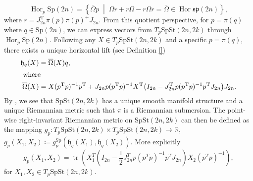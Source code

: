 %
\begin{equation*}
\operatorname{Hor}_{p}\mathrm{Sp}(2n)=\left\{ \overline{\Omega}p\;\middle|\;\Omega r+r\Omega-r\Omega r=\overline{\Omega}\in \operatorname{Hor}\mathfrak{sp}(2n) \right\},
\end{equation*}
%
where $r=J_{2n}^{\mathrm{T}}\pi(p)\pi (p)^+J_{2n}$. From this quotient perspective, for $p=\pi(q)$ where $q\in \mathrm{Sp}(2n)$, we can express vectors from $T_{p}\mathrm{SpSt}(2n, 2k)$ through $\operatorname{Hor}_{p}\mathrm{Sp}(2n)$. Following \cite[p.~5]{JensenZimmermann2024} any $X\in T_{p}\mathrm{SpSt}(2n, 2k)$ and a specific $p=\pi (q)$, there exists a unique horizontal lift (see Definition \ref{})
%
\begin{align}
\mathfrak{h}_{q}(X)&=\overline{\Omega}(X)q, \\
\intertext{ where }
\overline{\Omega}(X)&=X(p^{\mathrm{T}}p)^{-1}p^{\mathrm{T}}+J_{2n}p(p^{\mathrm{T}}p)^{-1}X^{\mathrm{T}}\big(I_{2n}-J_{2n}^{\mathrm{T}}p(p^{\mathrm{T}}p)^{-1}p^{\mathrm{T}}J_{2n}\big)J_{2n}.\label{eq:bar_omega}
\end{align}
%
%
%
%
By \cite[Thm.~2.28]{Lee2018}, we see that $\mathrm{SpSt}(2n, 2k)$ has a unique smooth manifold structure and a unique Riemannian metric such that $\pi$ is a Riemannian submersion. The point-wise right-invariant Riemannian metric on $\mathrm{SpSt}(2n, 2k)$ can then be defined as the mapping $g_{p}\colon T_{p}\mathrm{SpSt}(2n, 2k)\times T_{p}\mathrm{SpSt}(2n, 2k)\xrightarrow{}\mathbb{R}$, $g_{p}(X_{1},X_{2})\coloneqq g^{\mathrm{Sp}}_{p}(\mathfrak{h}_{q}(X_{1}),\mathfrak{h}_{q}(X_{2}))$. More explicitly
\begin{equation}\label{eq:spst_metric}
    g_{p}(X_{1},X_{2})=\operatorname{tr}\left(X_{1}^{T}\left(I_{2n}- \frac{1}{2}J_{2n}^{T}p(p^{T}p)^{-1}p^{T}J_{2n}\right)X_{2}(p^{T}p)^{-1}\right),
\end{equation}
for $X_{1},X_{2}\in T_{p}\mathrm{SpSt}(2n, 2k)$.


